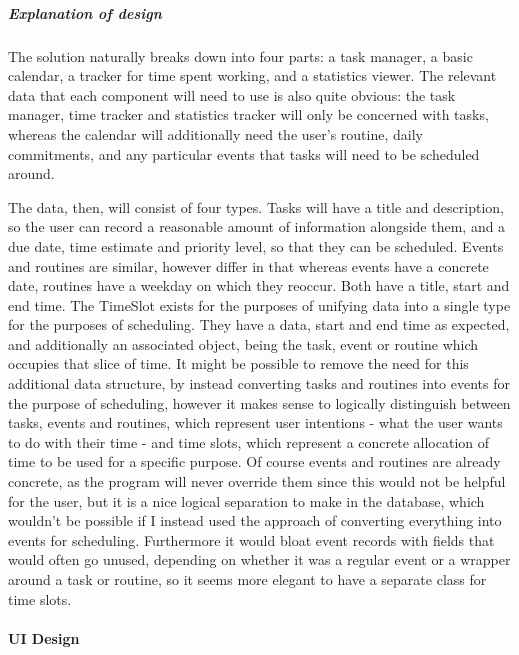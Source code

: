 \documentclass[]{article}
\let\oldparagraph\paragraph
\renewcommand{\paragraph}[1]{\oldparagraph{#1}\mbox{}}
\let\oldsubparagraph\subparagraph
\renewcommand{\subparagraph}[1]{\oldsubparagraph{#1}\mbox{}}
\begin{document}
\hypertarget{explanation-of-design}{%
\subparagraph{Explanation of design}\label{explanation-of-design}}

The solution naturally breaks down into four parts: a task manager, a
basic calendar, a tracker for time spent working, and a statistics
viewer. The relevant data that each component will need to use is also
quite obvious: the task manager, time tracker and statistics tracker
will only be concerned with tasks, whereas the calendar will
additionally need the user's routine, daily commitments, and any
particular events that tasks will need to be scheduled around.

The data, then, will consist of four types. Tasks will have a title and
description, so the user can record a reasonable amount of information
alongside them, and a due date, time estimate and priority level, so
that they can be scheduled. Events and routines are similar, however
differ in that whereas events have a concrete date, routines have a
weekday on which they reoccur. Both have a title, start and end time.
The TimeSlot exists for the purposes of unifying data into a single type
for the purposes of scheduling. They have a data, start and end time as
expected, and additionally an associated object, being the task, event
or routine which occupies that slice of time. It might be possible to
remove the need for this additional data structure, by instead
converting tasks and routines into events for the purpose of scheduling,
however it makes sense to logically distinguish between tasks, events
and routines, which represent user intentions - what the user wants to
do with their time - and time slots, which represent a concrete
allocation of time to be used for a specific purpose. Of course events
and routines are already concrete, as the program will never override
them since this would not be helpful for the user, but it is a nice
logical separation to make in the database, which wouldn't be possible
if I instead used the approach of converting everything into events for
scheduling. Furthermore it would bloat event records with fields that
would often go unused, depending on whether it was a regular event or a
wrapper around a task or routine, so it seems more elegant to have a
separate class for time slots.

\hypertarget{ui-design}{%
\paragraph{UI Design}\label{ui-design}}
\end{document}
